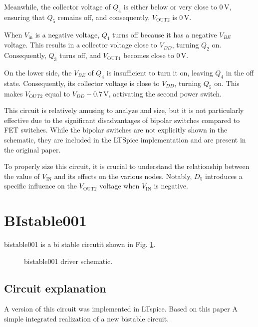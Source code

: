 \documentclass[12pt]{article}
\begin{document}
Meanwhile, the collector voltage of $Q_4$ is either below or very close to $0 \, \text{V}$, ensuring that $Q_5$ remains off, and consequently, $V_{\text{OUT2}}$ is $0 \, \text{V}$.  

When $V_{\text{in}}$ is a negative voltage, $Q_1$ turns off because it has a negative $V_{BE}$ voltage. This results in a collector voltage close to $V_{DD}$, turning $Q_2$ on. Consequently, $Q_3$ turns off, and $V_{\text{OUT1}}$ becomes close to $0 \, \text{V}$.  

On the lower side, the $V_{BE}$ of $Q_4$ is insufficient to turn it on, leaving $Q_4$ in the off state. Consequently, its collector voltage is close to $V_{DD}$, turning $Q_5$ on. This makes $V_{\text{OUT2}}$ equal to $V_{DD} - 0.7 \, \text{V}$, activating the second power switch.

This circuit is relatively amusing to analyze and size, but it is not particularly effective due to the significant disadvantages of bipolar switches compared to FET switches. While the bipolar switches are not explicitly shown in the schematic, they are included in the LTSpice implementation and are present in the original paper.  

To properly size this circuit, it is crucial to understand the relationship between the value of $V_{\text{IN}}$ and its effects on the various nodes. Notably, $D_5$ introduces a specific influence on the $V_{\text{OUT2}}$ voltage when $V_{\text{IN}}$ is negative.  





\section{BIstable001}



bistable001 is a bi stable circutit shown in Fig. \ref{bistable001}. 

\begin{figure}[H]
        \centering
        
        \caption{bistable001 driver schematic.}
        \label{bistable001}
\end{figure}

\subsection{Circuit explanation}

A version of this circuit was implemented in LTspice.  
Based on this paper A simple integrated realization of a new bistable circuit.
\end{document}
